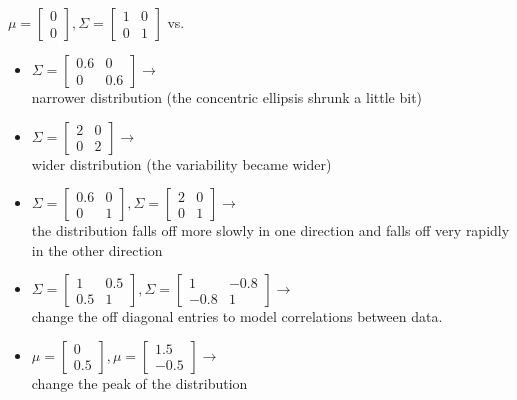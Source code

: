 $\mu = \begin{bmatrix}0\\0\end{bmatrix}, \Sigma = \begin{bmatrix}1 & 0\\0 & 1\end{bmatrix}$ vs.\\
\begin{itemize}
\item
$\Sigma = \begin{bmatrix}0.6 & 0\\0 & 0.6\end{bmatrix} \rightarrow$\\
narrower distribution (the concentric ellipsis shrunk a little bit)
\item
$\Sigma = \begin{bmatrix}2 & 0\\0 & 2\end{bmatrix} \rightarrow$\\
wider distribution (the variability became wider)
\item
$\Sigma = \begin{bmatrix}0.6 & 0\\0 & 1\end{bmatrix}, \Sigma = \begin{bmatrix}2 & 0\\0 & 1\end{bmatrix} \rightarrow$\\
the distribution falls off more slowly in one direction and falls off very rapidly in the other direction
\item
$\Sigma = \begin{bmatrix}1 & 0.5\\0.5 & 1\end{bmatrix}, \Sigma = \begin{bmatrix}1 & -0.8\\-0.8 & 1\end{bmatrix} \rightarrow$\\
change the off diagonal entries to model correlations between data.
\item
$\mu = \begin{bmatrix}0\\0.5\end{bmatrix}, \mu = \begin{bmatrix}1.5\\-0.5\end{bmatrix} \rightarrow$\\
change the peak of the distribution
\end{itemize}

